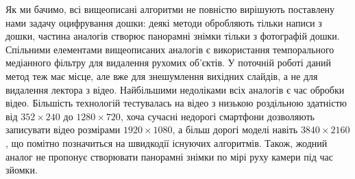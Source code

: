 \chapterConclusion

Як ми бачимо, всі вищеописані алгоритми не повністю вирішують поставлену нами задачу
оцифрування дошки: деякі методи обробляють тільки написи з дошки,
частина аналогів створює панорамні знімки тільки з фотографій дошки.
Спільними елементами вищеописаних аналогів є використання
темпорального медіанного фільтру для видалення рухомих об'єктів.
У поточній роботі даний метод теж має місце, але вже для знешумлення
вихідних слайдів, а не для видалення лектора з відео.
Найбільшими недоліками всіх аналогів є час обробки відео.
Більшість технологій тестувалась на відео з низькою роздільною здатністю
від $352\times240$ до $1280\times720$,
хоча сучасні недорогі смартфони дозволяють записувати відео
розмірами $1920\times1080$, а більш дорогі моделі навіть $3840\times2160$,
що помітно позначиться на швидкодії існуючих алгоритмів.
Також, жодний аналог не пропонує створювати панорамні знімки по мірі руху камери під
час зйомки.
